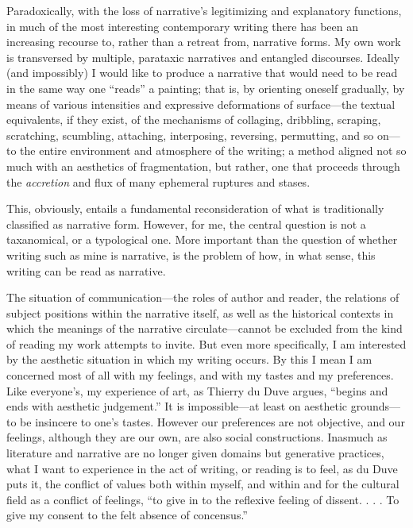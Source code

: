 \documentclass[
]{memoir}
\begin{document}
Paradoxically, with the loss of narrative's legitimizing and explanatory
functions, in much of the most interesting contemporary writing there
has been an increasing recourse to, rather than a retreat from,
narrative forms. My own work is transversed by multiple, parataxic
narratives and entangled discourses. Ideally (and impossibly) I would
like to produce a narrative that would need to be read in the same way
one ``reads'' a painting; that is, by orienting oneself gradually, by
means of various intensities and expressive deformations of
surface---the textual equivalents, if they exist, of the mechanisms of
collaging, dribbling, scraping, scratching, scumbling, attaching,
interposing, reversing, permutting, and so on---to the entire
environment and atmosphere of the writing; a method aligned not so much
with an aesthetics of fragmentation, but rather, one that proceeds
through the \emph{accretion} and flux of many ephemeral ruptures and
stases.

This, obviously, entails a fundamental reconsideration of what is
traditionally classified as narrative form. However, for me, the central
question is not a taxanomical, or a typological one. More important than
the question of whether writing such as mine is narrative, is the
problem of how, in what sense, this writing can be read as narrative.

The situation of communication---the roles of author and reader, the
relations of subject positions within the narrative itself, as well as
the historical contexts in which the meanings of the narrative
circulate---cannot be excluded from the kind of reading my work attempts
to invite. But even more specifically, I am interested by the aesthetic
situation in which my writing occurs. By this I mean I am concerned most
of all with my feelings, and with my tastes and my preferences. Like
everyone's, my experience of art, as Thierry du Duve argues, ``begins
and ends with aesthetic judgement.'' It is impossible---at least on
aesthetic grounds---to be insincere to one's tastes. However our
preferences are not objective, and our feelings, although they are our
own, are also social constructions. Inasmuch as literature and narrative
are no longer given domains but generative practices, what I want to
experience in the act of writing, or reading is to feel, as du Duve puts
it, the conflict of values both within myself, and within and for the
cultural field as a conflict of feelings, ``to give in to the reflexive
feeling of dissent. . . . To give my consent to the felt absence of
concensus.''
\end{document}
